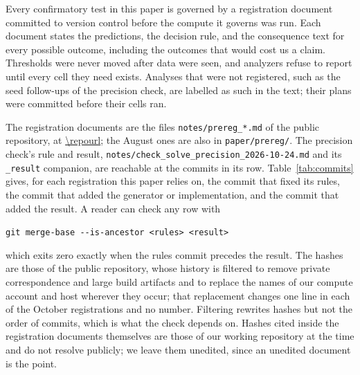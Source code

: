 Every confirmatory test in this paper is governed by a registration document
committed to version control before the compute it governs was run. Each
document states the predictions, the decision rule, and the consequence text
for every possible outcome, including the outcomes that would cost us a claim.
Thresholds were never moved after data were seen, and analyzers refuse to
report until every cell they need exists. Analyses that were not registered,
such as the seed follow-ups of the precision check, are labelled as such in
the text; their plans were committed before their cells ran.

The registration documents are the files \texttt{notes/prereg\_*.md} of the
public repository, at \url{\repourl}; the August ones are also in
\texttt{paper/prereg/}. The precision check's rule and result,
\texttt{notes/check\_solve\_precision\_2026-10-24.md} and its
\texttt{\_result} companion, are reachable at the commits in its row.
Table~\ref{tab:commits} gives, for each registration this paper relies on, the
commit that fixed its rules, the commit that added the generator or
implementation, and the commit that added the result. A reader can check any
row with
\begin{center}
\texttt{git merge-base -{}-is-ancestor <rules> <result>}
\end{center}
which exits zero exactly when the rules commit precedes the result. The hashes
are those of the public repository, whose history is filtered to remove
private correspondence and large build artifacts and to replace the names of
our compute account and host wherever they occur; that replacement changes
one line in each of the October registrations and no number. Filtering
rewrites hashes but not the order of commits, which is what the check depends
on. Hashes cited inside the registration documents themselves are those of
our working repository at the time and do not resolve publicly; we leave them
unedited, since an unedited document is the point.

